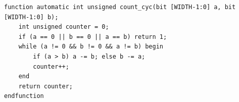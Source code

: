 \begin{verbatim}
function automatic int unsigned count_cyc(bit [WIDTH-1:0] a, bit [WIDTH-1:0] b);
    int unsigned counter = 0;
    if (a == 0 || b == 0 || a == b) return 1;
    while (a != 0 && b != 0 && a != b) begin
        if (a > b) a -= b; else b -= a;
        counter++;
    end
    return counter;
endfunction
\end{verbatim}